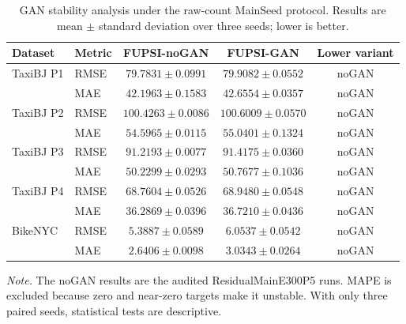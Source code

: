 \begin{table}[!htbp]
\centering
\caption{GAN stability analysis under the raw-count MainSeed protocol. Results are mean $\pm$ standard deviation over three seeds; lower is better.}
\label{tab:gan-stability}
\small
\setlength{\tabcolsep}{6pt}
\begin{tabular}{llccc}
\toprule
Dataset & Metric & FUPSI-noGAN & FUPSI-GAN & Lower variant \\
\midrule
TaxiBJ P1 & RMSE & $79.7831\pm0.0991$ & $79.9082\pm0.0552$ & noGAN \\
 & MAE & $42.1963\pm0.1583$ & $42.6554\pm0.0357$ & noGAN \\
TaxiBJ P2 & RMSE & $100.4263\pm0.0086$ & $100.6009\pm0.0570$ & noGAN \\
 & MAE & $54.5965\pm0.0115$ & $55.0401\pm0.1324$ & noGAN \\
TaxiBJ P3 & RMSE & $91.2193\pm0.0077$ & $91.4175\pm0.0360$ & noGAN \\
 & MAE & $50.2299\pm0.0293$ & $50.7677\pm0.1036$ & noGAN \\
TaxiBJ P4 & RMSE & $68.7604\pm0.0526$ & $68.9480\pm0.0548$ & noGAN \\
 & MAE & $36.2869\pm0.0396$ & $36.7210\pm0.0436$ & noGAN \\
BikeNYC & RMSE & $5.3887\pm0.0589$ & $6.0537\pm0.0542$ & noGAN \\
 & MAE & $2.6406\pm0.0098$ & $3.0343\pm0.0264$ & noGAN \\
\bottomrule
\end{tabular}
\parbox{\textwidth}{\footnotesize\textit{Note.} The noGAN results are the audited ResidualMainE300P5 runs. MAPE is excluded because zero and near-zero targets make it unstable. With only three paired seeds, statistical tests are descriptive.}
\end{table}
